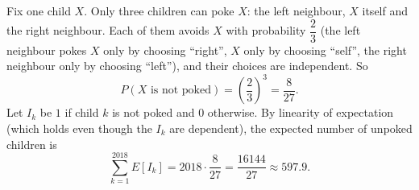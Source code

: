 Fix one child $X$. Only three children can poke $X$: the left neighbour, $X$ itself and the right neighbour. Each of them avoids $X$ with probability $\dfrac{2}{3}$ (the left neighbour pokes $X$ only by choosing ``right'', $X$ only by choosing ``self'', the right neighbour only by choosing ``left''), and their choices are independent. So
\[
P(X\text{ is not poked})=\left(\dfrac{2}{3}\right)^3=\dfrac{8}{27}.
\]
Let $I_k$ be $1$ if child $k$ is not poked and $0$ otherwise. By linearity of expectation (which holds even though the $I_k$ are dependent), the expected number of unpoked children is
\[
\sum_{k=1}^{2018}E[I_k]=2018\cdot\dfrac{8}{27}=\boxed{\dfrac{16144}{27}}\approx597.9 .
\]
